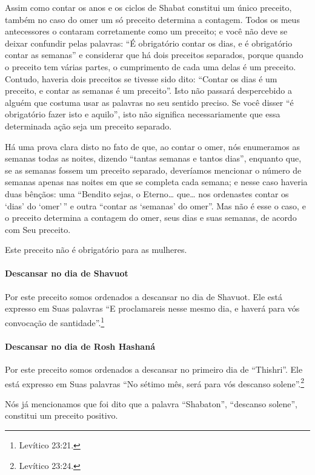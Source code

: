 \begin{multicols}{2}
Assim como contar os anos e os ciclos de Shabat constitui um único
preceito, também no caso do omer\starr{} um só preceito determina a
contagem. Todos os meus antecessores o contaram corretamente como um
preceito; e você não deve se deixar confundir pelas palavras: ``É
obrigatório contar os dias, e é obrigatório contar as semanas'' e
considerar que há dois preceitos separados, porque quando o preceito tem
várias partes, o cumprimento de cada uma delas é um preceito. Contudo,
haveria dois preceitos se tivesse sido dito: ``Contar os dias é um
preceito, e contar as semanas é um preceito''. Isto não passará
despercebido a alguém que costuma usar as palavras no seu sentido
preciso. Se você disser ``é obrigatório fazer isto e aquilo'', isto não
significa necessariamente que essa determinada ação seja um preceito
separado.

Há uma prova clara disto no fato de que, ao contar o omer\starr, nós
enumeramos as semanas todas as noites, dizendo ``tantas semanas e tantos
dias'', enquanto que, se as semanas fossem um preceito separado,
deveríamos mencionar o número de semanas apenas nas noites em que se
completa cada semana; e nesse caso haveria duas bênçãos: uma ``Bendito
sejas, o Eterno\ldots{} que\ldots{} nos ordenastes contar os `dias' do `omer'\,''
e outra ``contar as `semanas' do omer\starr''. Mas não é esse o caso, e o
preceito determina a contagem do omer\starr, seus dias e suas semanas, de
acordo com Seu preceito.

Este preceito não é obrigatório para as mulheres.

\paragraph{Descansar no dia de Shavuot\starr}

Por este preceito somos ordenados a descansar no dia de Shavuot\starr. Ele
está expresso em Suas palavras ``E proclamareis nesse mesmo dia, e
haverá para vós convocação de santidade''.\footnote{Levítico 23:21.}

\paragraph{Descansar no dia de Rosh Hashaná\starr}

Por este preceito somos ordenados a descansar no primeiro dia de
``Thishri''. Ele está expresso em Suas palavras ``No sétimo mês, será
para vós descanso solene''.\footnote{Levítico 23:24.}

Nós já mencionamos que foi dito que a palavra ``Shabaton'', ``descanso
solene'', constitui um preceito positivo.


\end{multicols}
